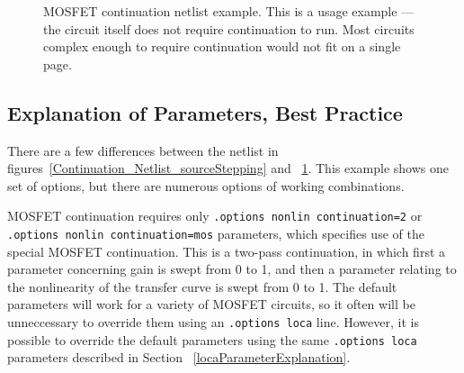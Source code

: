 \begin{figure}[htbp]
\begin{centering}
\caption[MOSFET continuation netlist example.]{MOSFET continuation netlist example. 
This is a usage example --- the circuit itself does not require continuation to run. Most circuits complex enough to require continuation would not fit on a single page.  
\label{Continuation_Netlist_mos}}
\end{centering}
\end{figure}

\subsection{Explanation of Parameters, Best Practice}

There are a few differences between the netlist in figures~\ref{Continuation_Netlist_sourceStepping} and ~\ref{Continuation_Netlist_mos}. This example shows one set of options, but there are numerous options of working combinations.  

MOSFET continuation requires only \texttt{.options nonlin continuation=2}
or \texttt{.options nonlin continuation=mos} parameters, which
specifies use of the special MOSFET continuation.  This is a two-pass
continuation, in which first a parameter concerning gain is swept from 0
to 1, and then a parameter relating to the nonlinearity of the
transfer curve is swept from 0 to 1.  The default parameters will work
for a variety of MOSFET circuits, so it often will be unneccessary to
override them using an \texttt{.options loca} line. However, it is
possible to override the default parameters using the same
\texttt{.options loca} parameters described in Section
~\ref{locaParameterExplanation}.


